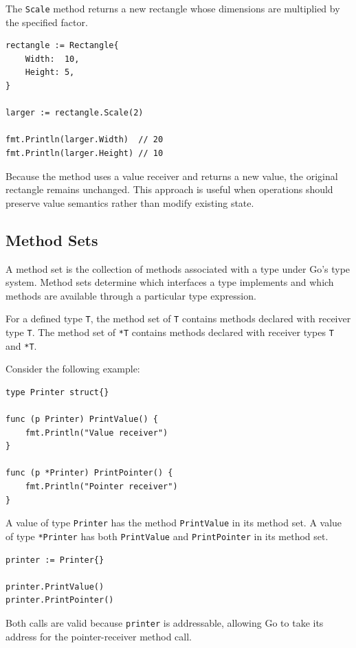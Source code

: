 The \texttt{Scale} method returns a new rectangle whose dimensions are multiplied by the specified factor.

\begin{lstlisting}
rectangle := Rectangle{
    Width:  10,
    Height: 5,
}

larger := rectangle.Scale(2)

fmt.Println(larger.Width)  // 20
fmt.Println(larger.Height) // 10
\end{lstlisting}

Because the method uses a value receiver and returns a new value, the original rectangle remains unchanged. This approach is useful when operations should preserve value semantics rather than modify existing state.

\subsection{Method Sets}

A method set is the collection of methods associated with a type under Go's type system. Method sets determine which interfaces a type implements and which methods are available through a particular type expression.

For a defined type \texttt{T}, the method set of \texttt{T} contains methods declared with receiver type \texttt{T}. The method set of \texttt{*T} contains methods declared with receiver types \texttt{T} and \texttt{*T}.

Consider the following example:

\begin{lstlisting}
type Printer struct{}

func (p Printer) PrintValue() {
    fmt.Println("Value receiver")
}

func (p *Printer) PrintPointer() {
    fmt.Println("Pointer receiver")
}
\end{lstlisting}

A value of type \texttt{Printer} has the method \texttt{PrintValue} in its method set. A value of type \texttt{*Printer} has both \texttt{PrintValue} and \texttt{PrintPointer} in its method set.

\begin{lstlisting}
printer := Printer{}

printer.PrintValue()
printer.PrintPointer()
\end{lstlisting}

Both calls are valid because \texttt{printer} is addressable, allowing Go to take its address for the pointer-receiver method call.

